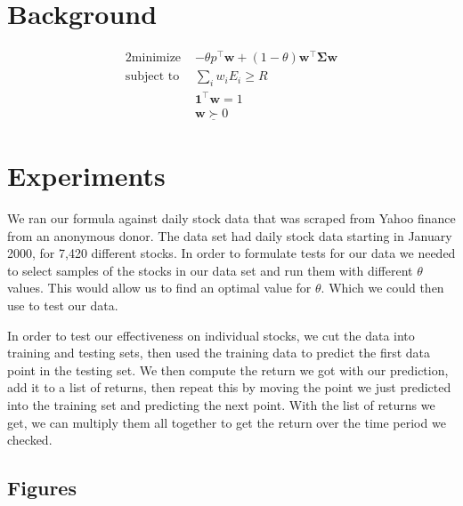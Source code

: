 \documentclass{article}
\begin{document}
\section{Background}
\label{background}

\begin{alignat*}{2}
    \text{minimize }   &   -\theta p^\top \textbf{w} + (1-\theta)\textbf{w}^\top \mathbf{\Sigma} \textbf{w}\\
    \text{subject to } & \sum_i w_i E_i \geq R \\
    & \textbf{1}^\top \textbf{w} = 1 \\
    & \textbf{w} \underline{\succ} 0
\end{alignat*}





\section{Experiments}
\label{exper}

We ran our formula against daily stock data that was scraped from Yahoo finance from an anonymous donor.  The data set had daily stock data starting in January 2000, for 7,420 different stocks.  In order to formulate tests for our data we needed to select samples of the stocks in our data set and run them with different $\theta$ values.  This would allow us to find an optimal value for $\theta$. Which we could then use to test our data.  

In order to test our effectiveness on individual stocks, we cut the data into training and testing sets, then used the training data to predict the first data point in the testing set. We then compute the return we got with our prediction, add it to a list of returns, then repeat this by moving the point we just predicted into the training set and predicting the next point.  With the list of returns we get, we can multiply them all together to get the return over the time period we checked.

\subsection{Figures}
\end{document}
